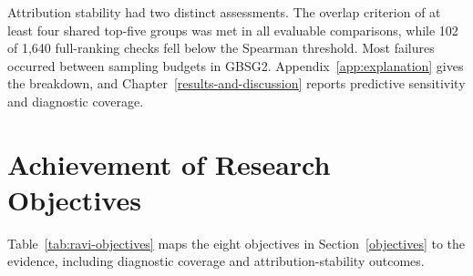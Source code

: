 Attribution stability had two distinct assessments. The overlap criterion of at least four shared top-five groups was met in all evaluable comparisons, while 102 of 1,640 full-ranking checks fell below the Spearman threshold. Most failures occurred between sampling budgets in GBSG2. Appendix~\ref{app:explanation} gives the breakdown, and Chapter~\ref{results-and-discussion} reports predictive sensitivity and diagnostic coverage.

\section{Achievement of Research Objectives}\label{achievement-of-research-objectives}

Table~\ref{tab:ravi-objectives} maps the eight objectives in Section~\ref{objectives} to the evidence, including diagnostic coverage and attribution-stability outcomes.

